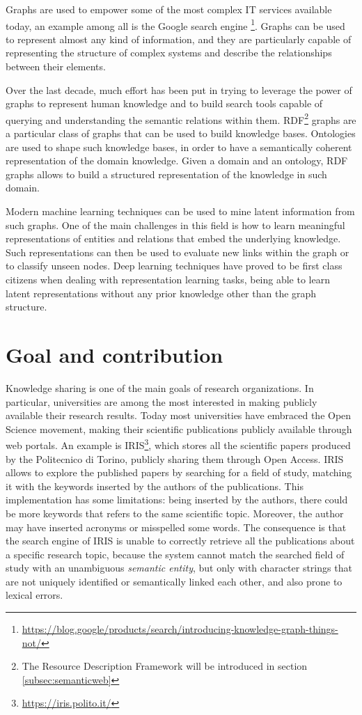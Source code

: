 \documentclass[%
    corpo=13.5pt,
    twoside,
    oldstyle,
    tipotesi=magistrale,
    greek,
    evenboxes
]{toptesi}
\begin{document}
Graphs are used to empower some of the most complex IT services available
today, an example among all is the Google search engine
\footnote{\url{https://blog.google/products/search/introducing-knowledge-graph-things-not/}}.
Graphs can be used to represent almost any kind of information, and they are
particularly capable of representing the structure of complex systems and
describe the relationships between their elements.

Over the last decade, much effort has been put in trying to leverage the power
of graphs to represent human knowledge and to build search tools capable of
querying and understanding the semantic relations within them.
RDF\footnote{The Resource Description Framework will be introduced in
section \ref{subsec:semanticweb}} graphs are a
particular class of graphs that can be used to build knowledge
bases. Ontologies are used to shape such knowledge bases, in order to have a
semantically coherent representation of the domain knowledge.
Given a domain and an ontology, RDF graphs allows to build a structured
representation of the knowledge in such domain.

Modern machine learning techniques can be used to mine latent information
from such graphs. One of the main challenges in this field is how to learn
meaningful representations of entities and relations that embed
the underlying knowledge. Such representations can then be used to evaluate
new links within the graph or to classify unseen nodes.
Deep learning techniques have proved to be first class citizens when
dealing with representation learning tasks, being able to learn latent
representations without any prior knowledge other than the graph structure.


\section{Goal and contribution}

Knowledge sharing is one of the main goals of research organizations. In
particular, universities are among the most interested in making publicly
available their research results. Today most universities have embraced the Open
Science movement, making their scientific publications publicly available
through web portals.
An example is IRIS\footnote{\url{https://iris.polito.it/}}, which
stores all the scientific papers produced by the Politecnico di Torino,
publicly sharing them through Open Access.
IRIS allows to explore the published papers by searching for a field of study,
matching it with the keywords inserted by the authors of the publications.
This implementation has some limitations: being inserted by the authors, there
could be more keywords that refers to the same scientific topic.
Moreover, the author may have inserted acronyms or misspelled some words.
The consequence is that the search engine of IRIS is unable to correctly
retrieve all the publications about a specific research topic, because the
system cannot match the searched field of study with an unambiguous
\emph{semantic entity}, but only with character strings that are not
uniquely identified or semantically linked each other, and also prone to
lexical errors.
\end{document}
